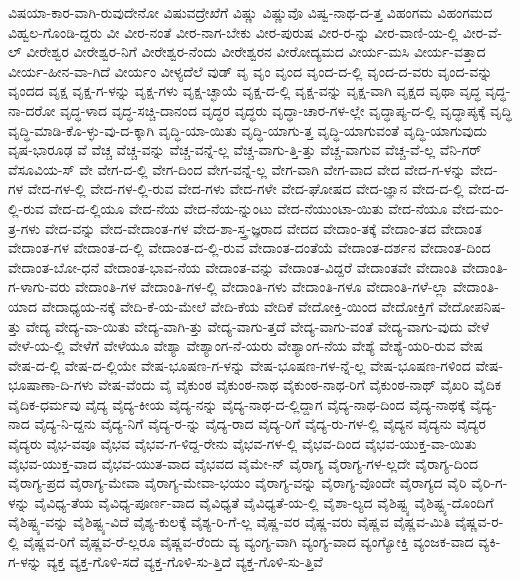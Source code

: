 {ವಿಷಯಾ-ಕಾರ-ವಾಗಿ-ರುವುದೇನೋ
ವಿಷುವದ್ರೇಖೆಗೆ
ವಿಷ್ಣು
ವಿಷ್ಣುವೊ
ವಿಷ್ವ-ನಾಥ-ದ-ತ್ತ
ವಿಹಂಗಮ
ವಿಹಂಗಮದ
ವಿಹ್ವಲ-ಗೊಂಡಿ-ದ್ದರು
ವೀ
ವೀರ-ನಂತೆ
ವೀರ-ನಾಗ-ಬೇಕು
ವೀರ-ಪುರುಷ
ವೀರ-ರ-ನ್ನು
ವೀರ-ವಾಣಿ-ಯ-ಲ್ಲಿ
ವೀರ-ವೆ-ಲ್
ವೀರೇಶ್ವರ
ವೀರೇಶ್ವರ-ನಿಗೆ
ವೀರೇಶ್ವರ-ನೆಂದು
ವೀರೇಶ್ವರನ
ವೀರೋದ್ಯಮದ
ವೀರ್ಯ-ಮಸಿ
ವೀರ್ಯ-ವತ್ತಾದ
ವೀರ್ಯ-ಹೀನ-ವಾ-ಗಿದೆ
ವೀರ್ಯಂ
ವೀಳ್ಯದೆಲೆ
ವುಡ್
ವೃ
ವೃಂ
ವೃಂದ
ವೃಂದ-ದ-ಲ್ಲಿ
ವೃಂದ-ದ-ವರು
ವೃಂದ-ವನ್ನು
ವೃಂದದ
ವೃಕ್ಷ
ವೃಕ್ಷ-ಗ-ಳನ್ನು
ವೃಕ್ಷ-ಗಳು
ವೃಕ್ಷ-ಚ್ಛಾಯೆ
ವೃಕ್ಷ-ದ-ಲ್ಲಿ
ವೃಕ್ಷ-ವನ್ನು
ವೃಕ್ಷ-ವಾಗಿ
ವೃಕ್ಷದ
ವೃಥಾ
ವೃದ್ಧ
ವೃದ್ಧ-ನಾ-ದರೋ
ವೃದ್ಧ-ಳಾದ
ವೃದ್ಧ-ಸಚ್ಚಿ-ದಾನಂದ
ವೃದ್ಧರ
ವೃದ್ಧರು
ವೃದ್ಧಾ-ಚಾರ-ಗಳ-ಲ್ಲೇ
ವೃದ್ಧಾಪ್ಯ-ದ-ಲ್ಲಿ
ವೃದ್ಧಾಪ್ಯಕ್ಕೆ
ವೃದ್ಧಿ
ವೃದ್ಧಿ-ಮಾಡಿ-ಕೊ-ಳ್ಳು-ವು-ದ-ಕ್ಕಾಗಿ
ವೃದ್ಧಿ-ಯಾ-ಯಿತು
ವೃದ್ಧಿ-ಯಾಗು-ತ್ತ
ವೃದ್ಧಿ-ಯಾಗುವಂತೆ
ವೃದ್ಧಿ-ಯಾಗುವುದು
ವೃಷ-ಭಾರೂಢ
ವೆ
ವೆಚ್ಚ
ವೆಚ್ಚ-ವನ್ನು
ವೆಚ್ಚ-ವನ್ನೆ-ಲ್ಲ
ವೆಚ್ಚ-ವಾಗು-ತ್ತಿ-ತ್ತು
ವೆಚ್ಚ-ವಾಗುವ
ವೆಚ್ಚ-ವೆ-ಲ್ಲ
ವೆನಿ-ಗರ್
ವೆಸೂವಿಯ-ಸ್
ವೇ
ವೇಗ-ದ-ಲ್ಲಿ
ವೇಗ-ದಿಂದ
ವೇಗ-ವನ್ನೆ-ಲ್ಲ
ವೇಗ-ವಾಗಿ
ವೇಗ-ವಾದ
ವೇದ
ವೇದ-ಗ-ಳನ್ನು
ವೇದ-ಗಳ
ವೇದ-ಗಳ-ಲ್ಲಿ
ವೇದ-ಗಳ-ಲ್ಲಿ-ರುವ
ವೇದ-ಗಳು
ವೇದ-ಗಳೇ
ವೇದ-ಘೋಷದ
ವೇದ-ಜ್ಞಾನ
ವೇದ-ದ-ಲ್ಲಿ
ವೇದ-ದ-ಲ್ಲಿ-ರುವ
ವೇದ-ದ-ಲ್ಲಿಯೂ
ವೇದ-ನೆಯ
ವೇದ-ನೆಯ-ನ್ನುಂಟು
ವೇದ-ನೆಯುಂಟಾ-ಯಿತು
ವೇದ-ನೆಯೂ
ವೇದ-ಮಂ-ತ್ರ-ಗಳು
ವೇದ-ವನ್ನು
ವೇದ-ವೇದಾಂತ-ಗಳ
ವೇದ-ಶಾ-ಸ್ತ್ರ-ಜ್ಞರಾದ
ವೇದದ
ವೇದಾಂ-ತಕ್ಕೆ
ವೇದಾಂ-ತದ
ವೇದಾಂತ
ವೇದಾಂತ-ಗಳ
ವೇದಾಂತ-ದ-ಲ್ಲಿ
ವೇದಾಂತ-ದ-ಲ್ಲಿ-ರುವ
ವೇದಾಂತ-ದಂತೆಯೆ
ವೇದಾಂತ-ದರ್ಶನ
ವೇದಾಂತ-ದಿಂದ
ವೇದಾಂತ-ಬೋ-ಧನೆ
ವೇದಾಂತ-ಭಾವ-ನೆಯ
ವೇದಾಂತ-ವನ್ನು
ವೇದಾಂತ-ವಿದ್ದರೆ
ವೇದಾಂತವೇ
ವೇದಾಂತಿ
ವೇದಾಂತಿ-ಗ-ಳಾಗು-ವರು
ವೇದಾಂತಿ-ಗಳ
ವೇದಾಂತಿ-ಗಳ-ಲ್ಲಿ
ವೇದಾಂತಿ-ಗಳು
ವೇದಾಂತಿ-ಗಳೂ
ವೇದಾಂತಿ-ಗಳೆ-ಲ್ಲಾ
ವೇದಾಂತಿ-ಯಾದ
ವೇದಾಧ್ಯಯ-ನಕ್ಕೆ
ವೇದಿ-ಕೆ-ಯ-ಮೇಲೆ
ವೇದಿ-ಕೆಯ
ವೇದಿಕೆ
ವೇದೋಕ್ತಿ-ಯಿಂದ
ವೇದೋಕ್ತಿಗೆ
ವೇದೋಪನಿಷ-ತ್ತು
ವೇದ್ಯ
ವೇದ್ಯ-ವಾ-ಯಿತು
ವೇದ್ಯ-ವಾಗಿ-ತ್ತು
ವೇದ್ಯ-ವಾಗು-ತ್ತದೆ
ವೇದ್ಯ-ವಾಗು-ವಂತೆ
ವೇದ್ಯ-ವಾಗು-ವುದು
ವೇಳೆ
ವೇಳೆ-ಯ-ಲ್ಲಿ
ವೇಳೆಗೆ
ವೇಳೆಯೂ
ವೇಶ್ಯಾ
ವೇಶ್ಯಾಂಗ-ನೆ-ಯರು
ವೇಶ್ಯಾಂಗ-ನೆಯ
ವೇಶ್ಯೆ
ವೇಶ್ಯೆ-ಯರಿ-ರುವ
ವೇಷ
ವೇಷ-ದ-ಲ್ಲಿ
ವೇಷ-ದ-ಲ್ಲಿಯೇ
ವೇಷ-ಭೂಷಣ-ಗ-ಳನ್ನು
ವೇಷ-ಭೂಷಣ-ಗಳ-ನ್ನೆ-ಲ್ಲ
ವೇಷ-ಭೂಷಣ-ಗಳಿಂದ
ವೇಷ-ಭೂಷಾಣಾ-ದಿ-ಗಳು
ವೇಷ-ವೆಂದು
ವೈ
ವೈಕುಂಠ
ವೈಕುಂಠ-ನಾಥ
ವೈಕುಂಠ-ನಾಥ-ರಿಗೆ
ವೈಕುಂಠ-ನಾಥ್
ವೈಖರಿ
ವೈದಿಕ
ವೈದಿಕ-ಧರ್ಮವು
ವೈದ್ಯ
ವೈದ್ಯ-ಕೀಯ
ವೈದ್ಯ-ನನ್ನು
ವೈದ್ಯ-ನಾಥ-ದ-ಲ್ಲಿದ್ದಾಗ
ವೈದ್ಯ-ನಾಥ-ದಿಂದ
ವೈದ್ಯ-ನಾಥಕ್ಕೆ
ವೈದ್ಯ-ನಾದ
ವೈದ್ಯ-ನಿ-ದ್ದನು
ವೈದ್ಯ-ನಿಗೆ
ವೈದ್ಯ-ರ-ನ್ನು
ವೈದ್ಯ-ರಾದ
ವೈದ್ಯ-ರಿಗೆ
ವೈದ್ಯ-ರು-ಗಳ-ಲ್ಲಿ
ವೈದ್ಯನ
ವೈದ್ಯನು
ವೈದ್ಯರ
ವೈದ್ಯರು
ವೈಭ-ವವೂ
ವೈಭವ
ವೈಭವ-ಗ-ಳಿದ್ದ-ರೇನು
ವೈಭವ-ಗಳ-ಲ್ಲಿ
ವೈಭವ-ದಿಂದ
ವೈಭವ-ಯುಕ್ತ-ವಾ-ಯಿತು
ವೈಭವ-ಯುಕ್ತ-ವಾದ
ವೈಭವ-ಯುತ-ವಾದ
ವೈಭವದ
ವೈಮೇ-ನ್
ವೈರಾಗ್ಯ
ವೈರಾಗ್ಯ-ಗಳ-ಲ್ಲದೇ
ವೈರಾಗ್ಯ-ದಿಂದ
ವೈರಾಗ್ಯ-ಪ್ರದ
ವೈರಾಗ್ಯ-ಮೇವಾ
ವೈರಾಗ್ಯ-ಮೇವಾ-ಭಯಂ
ವೈರಾಗ್ಯ-ವನ್ನು
ವೈರಾಗ್ಯ-ವೊಂದೇ
ವೈರಾಗ್ಯದ
ವೈರಿ
ವೈರಿ-ಗ-ಳನ್ನು
ವೈವಿಧ್ಯ-ತೆಯ
ವೈವಿಧ್ಯ-ಪೂರ್ಣ-ವಾದ
ವೈವಿಧ್ಯತೆ
ವೈವಿಧ್ಯತೆ-ಯ-ಲ್ಲಿ
ವೈಶಾ-ಲ್ಯದ
ವೈಶಿಷ್ಟ್ಯ
ವೈಶಿಷ್ಟ್ಯ-ದೊಂದಿಗೆ
ವೈಶಿಷ್ಟ್ಯ-ವನ್ನು
ವೈಶಿಷ್ಟ್ಯ-ವಿದೆ
ವೈಶ್ಯ-ಕುಲಕ್ಕೆ
ವೈಶ್ಯ-ರಿ-ಗೆ-ಲ್ಲ
ವೈಷ್ಣ-ವರ
ವೈಷ್ಣ-ವರು
ವೈಷ್ಣವ
ವೈಷ್ಣವ-ಮಿತಿ
ವೈಷ್ಣವ-ರ-ಲ್ಲಿ
ವೈಷ್ಣವ-ರಿಗೆ
ವೈಷ್ಣವ-ರೆ-ಲ್ಲರೂ
ವೈಷ್ಣವ-ರೆಂದು
ವ್ಯ
ವ್ಯಂಗ್ಯ-ವಾಗಿ
ವ್ಯಂಗ್ಯ-ವಾದ
ವ್ಯಂಗ್ಯೋಕ್ತಿ
ವ್ಯಂಜಕ-ವಾದ
ವ್ಯಕಿ-ಗ-ಳನ್ನು
ವ್ಯಕ್ತ
ವ್ಯಕ್ತ-ಗೊಳಿ-ಸದೆ
ವ್ಯಕ್ತ-ಗೊಳಿ-ಸು-ತ್ತಿದೆ
ವ್ಯಕ್ತ-ಗೊಳಿ-ಸು-ತ್ತಿವೆ
}
